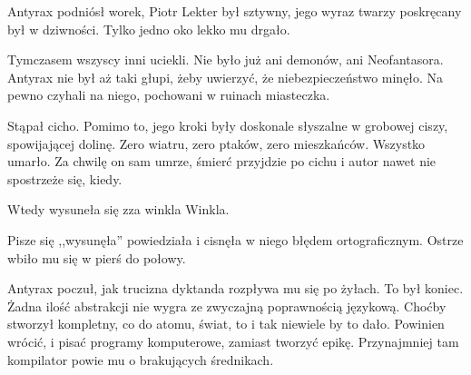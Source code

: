 \divider{}

Antyrax podniósł worek, Piotr Lekter był sztywny, jego wyraz twarzy poskręcany był w dziwności. Tylko jedno oko lekko mu drgało.

Tymczasem wszyscy inni uciekli. Nie było już ani demonów, ani Neofantasora. Antyrax nie był aż taki głupi, żeby uwierzyć, że niebezpieczeństwo minęło. 
Na pewno czyhali na niego, pochowani w ruinach miasteczka.

Stąpał cicho. Pomimo to, jego kroki były doskonale słyszalne w grobowej ciszy, spowijającej dolinę.
Zero wiatru, zero ptaków, zero mieszkańców. Wszystko umarło.
Za chwilę on sam umrze, śmierć przyjdzie po cichu i autor nawet nie spostrzeże się, kiedy.

Wtedy wysuneła się zza winkla Winkla. 

\begin{dialogue}
\ds{} Pisze się ,,wysunęła'' \dm{} powiedziała i cisnęła w niego błędem ortograficznym. Ostrze wbiło mu się w pierś do połowy.
\end{dialogue}
Antyrax poczuł, jak trucizna dyktanda rozpływa mu się po żyłach. To był koniec. Żadna ilość abstrakcji nie wygra ze zwyczajną poprawnością językową.
Choćby stworzył kompletny, co do atomu, świat, to i tak niewiele by to dało. 
Powinien wrócić, i pisać programy komputerowe, zamiast tworzyć epikę. Przynajmniej tam kompilator powie mu o brakujących średnikach.

